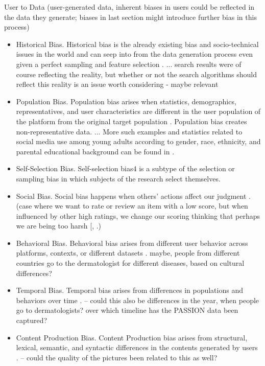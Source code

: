 \documentclass[12pt, a4paper, oneside]{book}   	%
\begin{document}
			User to Data (user-generated data, inherent biases in users could be reflected in the data they generate; biases in last section might introduce further bias in this process) \autocite{Mehrabi_2021}
			\begin{itemize}
				\item Historical Bias. Historical bias is the already existing bias and socio-technical issues in the world and can seep into from the data generation process even given a perfect sampling and feature selection \autocite{M144_Suresh_2021}. ... search results were of course reflecting the reality, but whether or not the search algorithms should reflect this reality is an issue worth considering \autocite{Mehrabi_2021} - maybe relevant
				\item Population Bias. Population bias arises when statistics, demographics, representatives, and user characteristics are different in the user population of the platform from the original target population \autocite{M120_Olteanu_2019}. Population bias creates non-representative data. ... More such examples and statistics related to social media use among young adults according to gender, race, ethnicity, and parental educational background can be found in \autocite{M64_Hargittai_2007}. \autocite{Mehrabi_2021}
				\item Self-Selection Bias. Self-selection bias4 is a subtype of the selection or sampling bias in which subjects of the research select themselves. \autocite{Mehrabi_2021}
				\item Social Bias. Social bias happens when others’ actions affect our judgment \autocite{M9_Baeza-Yates_2018}. (case where we want to rate or review an item with a low score, but when influenced by other high ratings, we change our scoring thinking that perhaps we are being too harsh [\autocite{M9_Baeza-Yates_2018}, \autocite{M151_Wang_2014}.) \autocite{Mehrabi_2021}
				\item Behavioral Bias. Behavioral bias arises from different user behavior across platforms, contexts, or different datasets \autocite{M120_Olteanu_2019}. \autocite{Mehrabi_2021} maybe, people from different countries go to the dermatologist for different diseases, based on cultural differences?
				\item Temporal Bias. Temporal bias arises from differences in populations and behaviors over time \autocite{M120_Olteanu_2019}. \autocite{Mehrabi_2021} -- could this also be differences in the year, when people go to dermatologists? over which timeline has the PASSION data been captured? 
				\item Content Production Bias. Content Production bias arises from structural, lexical, semantic, and syntactic differences in the contents generated by users \autocite{M120_Olteanu_2019}. \autocite{Mehrabi_2021} -- could the quality of the pictures been related to this as well?
			\end{itemize}
		
\end{document}
